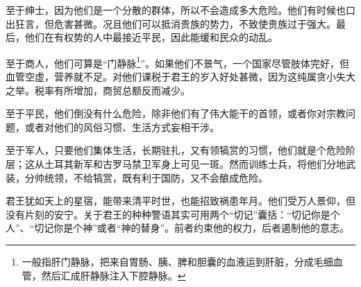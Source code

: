 \par 至于绅士，因为他们是一个分散的群体，所以不会造成多大危险。他们有时候也口出狂言，但危害甚微。况且他们可以抵消贵族的势力，不致使贵族过于强大。最后，他们在有权势的人中最接近平民，因此能缓和民众的动乱。
\par 至于商人，他们可算是“门静脉\footnote{一般指肝门静脉，把来自胃肠、胰、脾和胆囊的血液运到肝脏，分成毛细血管，然后汇成肝静脉注入下腔静脉。}”。如果他们不景气，一个国家尽管肢体完好，但血管空虚，营养就不足。对他们课税于君王的岁入好处甚微，因为这纯属贪小失大之举。税率有所增加，商贸总额反而减少。
\par 至于平民，他们倒没有什么危险，除非他们有了伟大能干的首领，或者你对宗教问题，或者对他们的风俗习惯、生活方式妄相干涉。
\par 至于军人，只要他们集体生活，长期驻扎，又有领犒赏的习惯，他们就是个危险阶层；这从土耳其新军和古罗马禁卫军身上可见一斑。然而训练士兵，将他们分地武装，分帅统领，不给犒赏，既有利于国防，又不会酿成危险。
\par 君王犹如天上的星宿，能带来清平时世，也能招致祸患年月。他们受万人景仰，但没有片刻的安宁。关于君王的种种警语其实可用两个“切记”囊括：“切记你是个人”、“切记你是个神”或者“神的替身”。前者约束他的权力，后者遏制他的意志。




